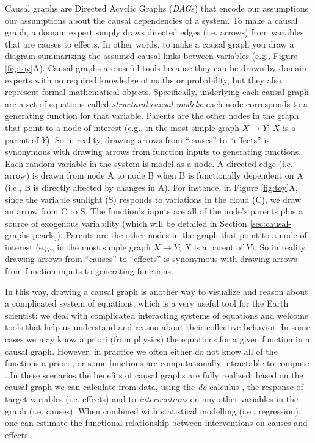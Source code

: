 \documentclass[12pt]{article}
\begin{document}
Causal graphs are Directed Acyclic Graphs (\emph{DAG}s) that encode
our assumptions our assumptions about the causal dependencies of a
system. To make a causal graph, a domain expert simply draws directed
edges (i.e. arrows) from variables that are causes to effects. In
other words, to make a causal graph you draw a diagram
summarizing the assumed causal links between variables (e.g., Figure
\ref{fig:toy}A). Causal graphs are useful tools because they can be
drawn by domain experts with no required knowledge of maths or
probability, but they also represent formal mathematical
objects. Specifically, underlying each causal graph are a set of
equations called \emph{structural causal models}: each node
corresponds to a generating function for that variable. Parents are the other nodes in the
graph that point to a node of interest (e.g., in the most simple graph
$X \to Y$; $X$ is a parent of $Y$). So in reality, drawing arrows from
``causes'' to ``effects'' is synonymous with drawing arrows from
function inputs to generating functions. Each random variable in the system is
model as a node. A directed edge (i.e. arrow) is drawn from
node A to node B when B is functionally dependent on A (i.e., B is
directly affected by changes in A). For instance, in Figure
\ref{fig:toy}A, since the variable sunlight (S) responds to variations
in the cloud (C), we draw an arrow from C to S. The function's inputs are all of the node's
parents plus a source of exogenous variability (which will be detailed
in Section \ref{sec:causal-graphs-pearls}). Parents are the other nodes in the graph that point to
a node of interest (e.g., in the most simple graph $X \to Y$; $X$ is a
parent of $Y$). So in reality, drawing arrows from ``causes'' to
``effects'' is synonymous with drawing arrows from function inputs to
generating functions.

In this way, drawing a causal graph is another way to visualize and
reason about a complicated system of equations, which is a very useful
tool for the Earth scientist: we deal with complicated interacting
systems of equations and welcome tools that help us understand and
reason about their collective behavior. In some cases we may know a
priori (from physics) the equations for a given function in a causal
graph. However, in practice we often either do not know all of the
functions a priori \citep[e.g., plant stomata response to
VPD;][]{massmann2019, zhou2019arid, zhou2019feedback, grossiord2020},
or some functions are computationally intractable to compute
\citep[e.g., turbulence, moist convection, and cloud microphysics in
large scale models;][]{zadra2018,gentine2018}. In these scenarios the benefits of
causal graphs are fully realized: based on the causal graph we can
calculate from data, using the \textit{do-}calculus
\citep{pearl-1994-do-calculus}, the response of target variables
(i.e. effects) and to \textit{interventions} on any other variables in
the graph (i.e. causes). When combined with statistical modelling
(i.e., regression), one can estimate the functional relationship
between interventions on causes and effects.
\end{document}
